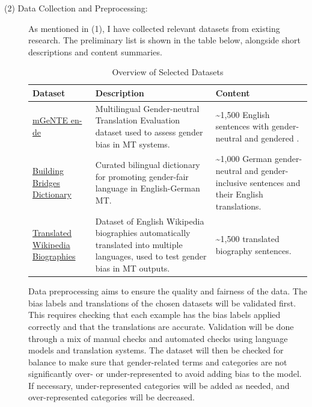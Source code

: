 \begin{description}
    
\item[(2) Data Collection and Preprocessing:] 

As mentioned in (1), I have collected relevant datasets from existing research. The preliminary list is shown in the table below, alongside short descriptions and content summaries.

\begin{table}[h!]
    \centering
    \renewcommand{\arraystretch}{1.3}
    \begin{tabularx}{\textwidth}{|X|X|X|}
    \hline
    \textbf{Dataset} & \textbf{Description} & \textbf{Content} \\ \hline
    \href{https://huggingface.co/datasets/FBK-MT/mGeNTE}{mGeNTE en-de} \parencite{savoldi_mgente_2025} & Multilingual Gender-neutral Translation Evaluation dataset used to assess gender bias in MT systems. & \textasciitilde1,500 English sentences with gender-neutral and gendered . \\ \hline
    \href{https://github.com/g8a9/building-bridges-gender-fair-german-mt}{Building Bridges Dictionary} \parencite{lardelli_building_2024} & Curated bilingual dictionary for promoting gender-fair language in English-German MT. & \textasciitilde1,000 German gender-neutral and gender-inclusive sentences and their English translations.  \\ \hline
    \href{https://research.google/blog/a-dataset-for-studying-gender-bias-in-translation/}{Translated Wikipedia Biographies} \parencite{stella_dataset_2021} & Dataset of English Wikipedia biographies automatically translated into multiple languages, used to test gender bias in MT outputs. & \textasciitilde1,500 translated biography sentences. \\ \hline
    \end{tabularx}
    \caption{Overview of Selected Datasets}
    \label{tab:datasets}
\end{table}

Data preprocessing aims to ensure the quality and fairness of the data.
The bias labels and translations of the chosen datasets will be validated first. This requires checking that each example has the bias labels applied correctly and that the translations are accurate. Validation will be done through a mix of manual checks and automated checks using language models and translation systems. The dataset will then be checked for balance to make sure that gender-related terms and categories are not significantly over- or under-represented to avoid adding bias to the model. If necessary, under-represented categories will be added as needed, and over-represented categories will be decreased.


\end{description}

